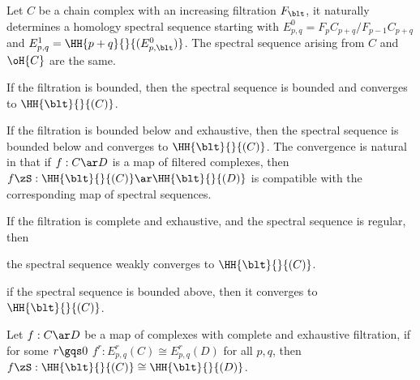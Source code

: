 \documentclass[a4paper, twoside]{article}
\begin{document}
\begin{thm}[5.4.1, 5.4.5, 5.5.1, 5.5.10]
    Let $C$ be a chain complex with an increasing filtration $F_{\blt}$, it naturally determines a homology spectral sequence starting with $E_{p,q}^{0}=F_{p}C_{p+q}/F_{p-1}C_{p+q}$ and $E_{p,q}^{1}=\HH{p+q}{}{(E_{p,\blt}^{0})}$. The spectral sequence arising from $C$ and $\oH{C}$ are the same.

    \begin{itm}
        \item If the filtration is bounded, then the spectral sequence is bounded and converges to $\HH{\blt}{}{(C)}$.
        \item If the filtration is bounded below and exhaustive, then the spectral sequence is bounded below and converges to $\HH{\blt}{}{(C)}$. The convergence is natural in that if $f:C\ar D$ is a map of filtered complexes, then $f\zS:\HH{\blt}{}{(C)}\ar\HH{\blt}{}{(D)}$ is compatible with the corresponding map of spectral sequences.
        \item If the filtration is complete and exhaustive, and the spectral sequence is regular, then
        \begin{itm}
            \item the spectral sequence weakly converges to $\HH{\blt}{}{(C)}$.
            \item if the spectral sequence is bounded above, then it converges to $\HH{\blt}{}{(C)}$.
        \end{itm}
    \end{itm}
\end{thm}

\begin{thm}
    Let $f:C\ar D$ be a map of complexes with complete and exhaustive filtration, if for some $r\gqs0$ $f^{r}:E_{p,q}^{r}(C)\cong E_{p,q}^{r}(D)$ for all $p,q$, then $f\zS:\HH{\blt}{}{(C)}\cong\HH{\blt}{}{(D)}$.
\end{thm}
\end{document}
